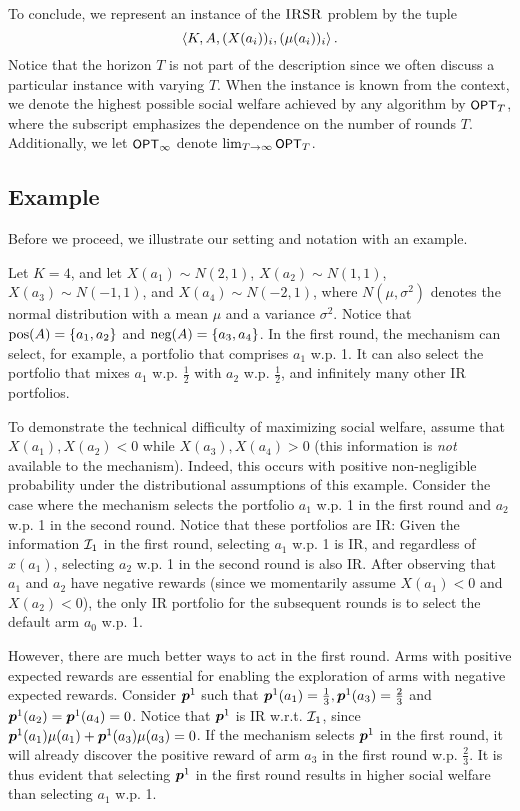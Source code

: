 To conclude, we represent an instance of the $\textsc{IRSR}$ problem by the tuple 
\[
\left\langle {K, A, (X(a_i))_i, (\mu(a_i))_i} \right\rangle.
\]
Notice that the horizon $T$ is not part of the description since we often discuss a particular instance with varying $T$. When the instance is known from the context, we denote the highest possible social welfare achieved by any algorithm by ${\small\textnormal{\textsf{OPT}}}_T$, where the subscript emphasizes the dependence on the number of rounds $T$. Additionally, we let ${\small\textnormal{\textsf{OPT}}}_{\infty}$  denote $\lim_{T\rightarrow \infty} {\small\textnormal{\textsf{OPT}}}_T$.

\subsection{Example}
Before we proceed, we illustrate our setting and notation with an example.
\begin{example}\label{example with normal}
Let $K=4$, and let{\setmuskip{\thickmuskip}{0mu}
$X(a_1)\sim N(2,1)$, $X(a_2)\sim N(1,1)$, $X(a_3)\sim N(-1,1)$, and $X(a_4)\sim N(-2,1)$, where $N(\mu,\sigma^2)$ denotes the normal distribution with a mean $\mu$ and a variance $\sigma^2$. 
}%
Notice that $\textnormal{pos}(A)=\{a_1,a_2\}$ and  $\textnormal{neg}(A)=\{a_3,a_4\}$. In the first round, the mechanism can select, for example, a portfolio that comprises $a_1$ w.p. 1. It can also select the portfolio that mixes $a_1$ w.p. $\frac{1}{2}$ with $a_2$ w.p. $\frac{1}{2}$, and infinitely many other IR portfolios.

To demonstrate the technical difficulty of maximizing social welfare, assume that $X(a_1),X(a_2) <0$ while $X(a_3),X(a_4)>0$ (this information is \textit{not} available to the mechanism). Indeed, this occurs with positive non-negligible probability under the distributional assumptions of this example. Consider the case where the mechanism selects the portfolio $a_1$ w.p. 1 in the first round and $a_2$ w.p. 1 in the second round. Notice that these portfolios are IR: Given the information $\mathcal{I}_1$ in the first round, selecting $a_1$ w.p. 1 is IR, and regardless of $x(a_1)$, selecting $a_2$ w.p. 1 in the second round is also IR. After observing that $a_1$ and $a_2$ have negative rewards (since we momentarily assume $X(a_1)<0$ and $X(a_2) <0$), the only IR portfolio for the subsequent rounds is to select the default arm $a_0$ w.p. 1.


However, there are much better ways to act in the first round. Arms with positive expected rewards are essential for enabling the exploration of arms with negative expected rewards. Consider $\boldsymbol{ p }^1$ such that $\boldsymbol{ p }^1(a_1)=\frac{1}{3},\boldsymbol{ p }^1(a_3)=\frac{2}{3}$ and $\boldsymbol{ p }^1(a_2)=\boldsymbol{ p }^1(a_4)=0$. Notice that $\boldsymbol{ p }^1$ is IR w.r.t. $\mathcal{I}_1$, since $\boldsymbol{ p }^1(a_1)\mu(a_1)+\boldsymbol{ p }^1(a_3)\mu(a_3)=0$. If the mechanism selects $\boldsymbol{ p }^1$ in the first round, it will already discover the positive reward of arm $a_3$ in the first round w.p. $\frac{2}{3}$. It is thus evident that selecting $\boldsymbol{ p }^1$ in the first round results in higher social welfare than selecting $a_1$ w.p. 1.  
\end{example}

